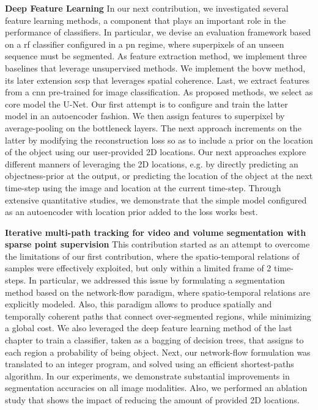 \textbf{Deep Feature Learning}
In our next contribution, we investigated several feature learning methods, a component that plays an important role in the performance of classifiers.
In particular, we devise an evaluation framework based on a \gls{rf} classifier configured in a \gls{pn} regime, where superpixels of an unseen sequence must be segmented.
As feature extraction method, we implement three baselines that leverage unsupervised methods.
We implement the \gls{bovw} method, its later extension \gls{scsp} that leverages spatial coherence.
Last, we extract features from a \gls{cnn} pre-trained for image classification.
As proposed methods, we select as core model the U-Net.
Our first attempt is to configure and train the latter model in an autoencoder fashion.
We then assign features to superpixel by average-pooling on the bottleneck layers.
The next approach increments on the latter by modifying the reconstruction loss so as to include a prior on the location of the object using our user-provided 2D locations.
Our next approaches explore different manners of leveraging the 2D locations, e.g. by directly predicting an objectness-prior at the output, or predicting the location of the object at the next time-step using the image and location at the current time-step.
Through extensive quantitative studies, we demonstrate that the simple model configured as an autoencoder with location prior added to the loss works best.

\textbf{Iterative multi-path tracking for video and volume segmentation with sparse point supervision}
This contribution started as an attempt to overcome the limitations of our first contribution, where the spatio-temporal relations of samples were effectively exploited, but only within a limited frame of 2 time-steps.
In particular, we addressed this issue by formulating a segmentation method based on the network-flow paradigm, where spatio-temporal relations are explicitly modeled.
Also, this paradigm allows to produce spatially and temporally coherent paths that connect over-segmented regions, while minimizing a global cost.
We also leveraged the deep feature learning method of the last chapter to train a classifier, taken as a bagging of decision trees, that assigns to each region a probability of being object.
Next, our network-flow formulation was translated to an integer program, and solved using an efficient shortest-paths algorithm.
In our experiments, we demonstrate substantial improvements in segmentation accuracies on all image modalities.
Also, we performed an ablation study that shows the impact of reducing the amount of provided 2D locations.

